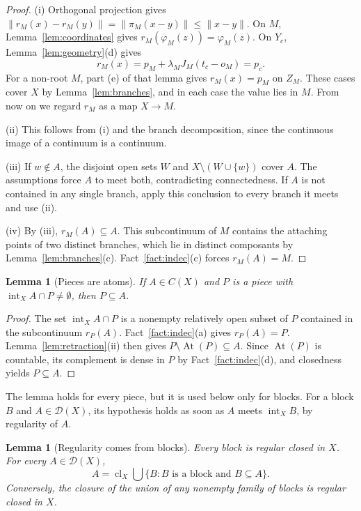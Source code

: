 \documentclass[11pt]{amsart}
\newtheorem{lemma}[theorem]{Lemma}
\theoremstyle{definition}
\theoremstyle{remark}
\newcommand{\clX}{\operatorname{cl}_X}
\newcommand{\intX}{\operatorname{int}_X}
\newcommand{\At}{\operatorname{At}}
\newcommand{\D}{\mathcal{D}}
\begin{document}
\begin{proof}
(i) Orthogonal projection gives $\|r_M(x)-r_M(y)\|=\|\pi_M(x-y)\|\le\|x-y\|$. On $M$, Lemma~\ref{lem:coordinates} gives $r_M(\varphi_M(z))=\varphi_M(z)$. On $Y_c$, Lemma~\ref{lem:geometry}(d) gives
\[
r_M(x)=p_M+\lambda_MJ_M(t_c-o_M)=p_c.
\]
For a non-root $M$, part (e) of that lemma gives $r_M(x)=p_M$ on $Z_M$. These cases cover $X$ by Lemma~\ref{lem:branches}, and in each case the value lies in $M$. From now on we regard $r_M$ as a map $X\to M$.

(ii) This follows from (i) and the branch decomposition, since the continuous image of a continuum is a continuum.

(iii) If $w\notin A$, the disjoint open sets $W$ and $X\setminus(W\cup\{w\})$ cover $A$. The assumptions force $A$ to meet both, contradicting connectedness. If $A$ is not contained in any single branch, apply this conclusion to every branch it meets and use (ii).

(iv) By (iii), $r_M(A)\subseteq A$. This subcontinuum of $M$ contains the attaching points of two distinct branches, which lie in distinct composants by Lemma~\ref{lem:branches}(c). Fact~\ref{fact:indec}(c) forces $r_M(A)=M$.
\end{proof}

\begin{lemma}[Pieces are atoms]\label{lem:atoms}
If $A\in C(X)$ and $P$ is a piece with $\intX A\cap P\neq\emptyset$, then $P\subseteq A$.
\end{lemma}

\begin{proof}
The set $\intX A\cap P$ is a nonempty relatively open subset of $P$ contained in the subcontinuum $r_P(A)$. Fact~\ref{fact:indec}(a) gives $r_P(A)=P$. Lemma~\ref{lem:retraction}(ii) then gives $P\setminus\At(P)\subseteq A$. Since $\At(P)$ is countable, its complement is dense in $P$ by Fact~\ref{fact:indec}(d), and closedness yields $P\subseteq A$.
\end{proof}

The lemma holds for every piece, but it is used below only for blocks. For a block $B$ and $A\in\D(X)$, its hypothesis holds as soon as $A$ meets $\intX B$, by regularity of $A$.

\begin{lemma}[Regularity comes from blocks]\label{lem:blocks-generate}
Every block is regular closed in $X$. For every $A\in\D(X)$,
\[
A=\clX\bigcup\{B: B\text{ is a block and }B\subseteq A\}.
\]
Conversely, the closure of the union of any nonempty family of blocks is regular closed in $X$.
\end{lemma}
\end{document}

